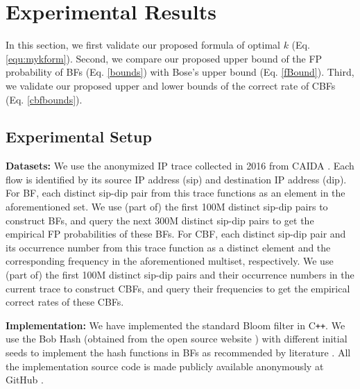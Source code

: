 \presec
\section{Experimental Results} \postsec
\label{sec:evaluation}
In this section, we first validate our proposed formula of optimal $k$ (Eq. \ref{equ:mykform}).
Second, we compare our proposed upper bound of the FP probability of BFs (Eq. \ref{bounds}) with Bose's upper bound (Eq. \ref{fBound}). 
Third, we validate our proposed upper and lower bounds of the correct rate of CBFs (Eq. \ref{cbfbounds}). 

\presub
\subsection{Experimental Setup}\postsub
\label{setup}

\noindent\textbf{Datasets: }
We use the anonymized IP trace collected in 2016 from CAIDA \cite{caida}.
Each flow is identified by its source IP address (sip) and destination IP address (dip). 
For BF, each distinct sip-dip pair from this trace functions as an element in the aforementioned set. 
We use (part of) the first 100M distinct sip-dip pairs to construct BFs, and query the next 300M distinct sip-dip pairs to get the empirical FP probabilities of these BFs. 
For CBF, each distinct sip-dip pair and its occurrence number from this trace function as a distinct element and the corresponding frequency in the aforementioned multiset, respectively. 
We use (part of) the first 100M distinct sip-dip pairs and their occurrence numbers in the current trace to construct CBFs, and query their frequencies to get the empirical correct rates of these CBFs. 

\noindent\textbf{Implementation: }
We have implemented the standard Bloom filter in C\texttt{++}.
We use the Bob Hash (obtained from the open source website \cite{bobhash}) with different initial seeds to implement the hash functions in BFs as recommended by literature \cite{hashformeasure}. 
All the implementation source code is made publicly available anonymously at GitHub \cite{opensource}.


